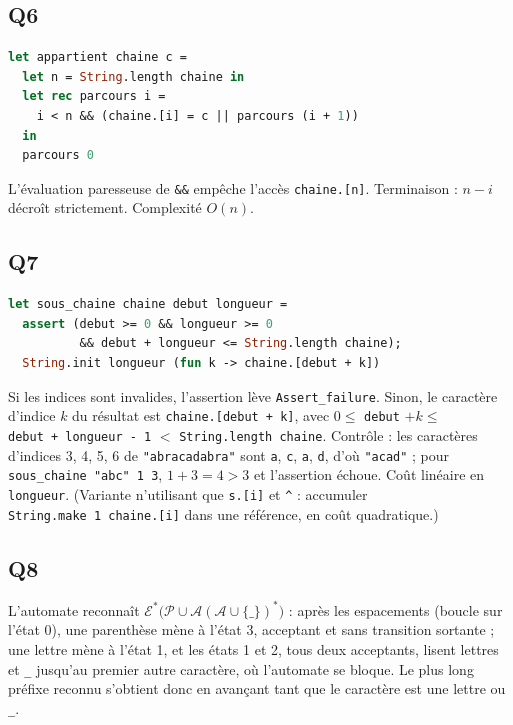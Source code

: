 \documentclass[11pt,a4paper]{article}
\begin{document}
\hypertarget{q6}{%
\subsection{Q6}\label{q6}}

\begin{lstlisting}[language=Caml]
let appartient chaine c =
  let n = String.length chaine in
  let rec parcours i =
    i < n && (chaine.[i] = c || parcours (i + 1))
  in
  parcours 0
\end{lstlisting}

L'évaluation paresseuse de \texttt{\&\&} empêche l'accès \texttt{chaine.{[}n{]}}. Terminaison : \(n-i\) décroît strictement. Complexité \(O(n)\).

\hypertarget{q7}{%
\subsection{Q7}\label{q7}}

\begin{lstlisting}[language=Caml]
let sous_chaine chaine debut longueur =
  assert (debut >= 0 && longueur >= 0
          && debut + longueur <= String.length chaine);
  String.init longueur (fun k -> chaine.[debut + k])
\end{lstlisting}

Si les indices sont invalides, l'assertion lève \texttt{Assert\_failure}. Sinon, le caractère d'indice \(k\) du résultat est \texttt{chaine.{[}debut\ +\ k{]}\allowbreak{}}, avec \(0\le\) \texttt{debut} \(+k\le\) \texttt{debut\ +\ longueur\ -\ 1} \(<\) \texttt{String.length\ chaine}. Contrôle : les caractères d'indices 3, 4, 5, 6 de \texttt{"abracadabra"} sont \texttt{a}, \texttt{c}, \texttt{a}, \texttt{d}, d'où \texttt{"acad"} ; pour \texttt{sous\_chaine\ "abc"\ 1\ 3}, \(1+3=4>3\) et l'assertion échoue. Coût linéaire en \texttt{longueur}. (Variante n'utilisant que \texttt{s.{[}i{]}} et \texttt{\^{}} : accumuler \texttt{String.make\ 1\ chaine.{[}i{]}\allowbreak{}} dans une référence, en coût quadratique.)

\hypertarget{q8}{%
\subsection{Q8}\label{q8}}

L'automate reconnaît \(\mathcal E^*\bigl(\mathcal P\cup\mathcal A(\mathcal A\cup\{\_\})^*\bigr)\) : après les espacements (boucle sur l'état 0), une parenthèse mène à l'état 3, acceptant et sans transition sortante ; une lettre mène à l'état 1, et les états 1 et 2, tous deux acceptants, lisent lettres et \texttt{\_} jusqu'au premier autre caractère, où l'automate se bloque. Le plus long préfixe reconnu s'obtient donc en avançant tant que le caractère est une lettre ou \texttt{\_}.
\end{document}
